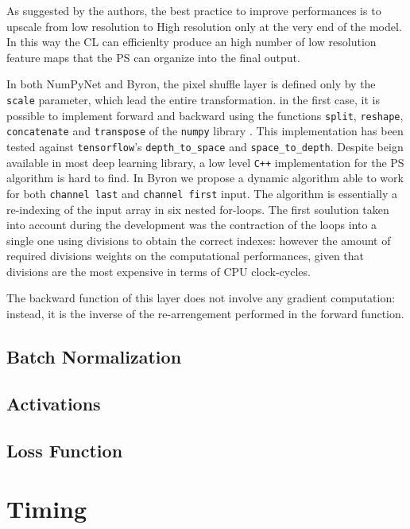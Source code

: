 \documentclass[12pt,a4paper]{report}
\begin{document}
As suggested by the authors, the best practice to improve performances is to upscale from low resolution to High resolution only at the very end of the model. 
In this way the CL can efficienlty produce an high number of low resolution feature maps that the PS can organize into the final output. 

In both NumPyNet and Byron, the pixel shuffle layer is defined only by the \texttt{scale} parameter, which lead the entire transformation.
in the first case, it is possible to implement forward and backward using the functions \texttt{split}, \texttt{reshape}, \texttt{concatenate} and \texttt{transpose} of the \texttt{numpy} library \cite{numpy}. 
This implementation has been tested against \texttt{tensorflow}'s \texttt{depth\_to\_space} and \texttt{space\_to\_depth}.
Despite beign available in most deep learning library, a low level  \texttt{C++} implementation for the PS algorithm is hard to find. 
In Byron we propose a dynamic algorithm able to work for both \texttt{channel last} and \texttt{channel first} input. 
The algorithm is essentially a re-indexing of the input array in six nested for-loops. The first soulution taken into account during the development was the contraction of the loops into a single one using divisions to obtain the correct indexes: however the amount of required divisions weights on the computational performances, given that divisions are the most expensive in terms of CPU clock-cycles. 

The backward function of this layer does not involve any gradient computation: instead, it is the inverse of the re-arrengement performed in the forward function.

\subsection*{Batch Normalization}

\cite{batchnorm}

\subsection*{Activations}
\subsection*{Loss Function}
\section{Timing}
\section{}
\end{document}
